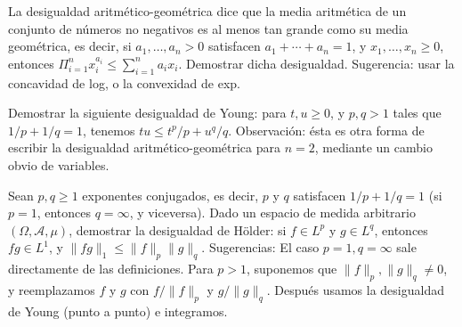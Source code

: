 
\begin{problem}[3]La desigualdad aritm\'etico-geom\'etrica 
dice que la media  aritm\'etica de un conjunto de n\'umeros no negativos es al menos tan grande
como su media  geom\'etrica, es decir, si $a_1, \dots ,a_n > 0$ satisfacen  $a_1 + \cdots  + a_n = 1$,  y  
 $x_1, \dots ,x_n \ge 0$, entonces $\Pi_{i=1}^n x_i^{a_i} \le \sum_{i=1}^n a_i x_i$.
Demostrar dicha desigualdad. Sugerencia: usar la concavidad
de log, o la convexidad de exp.
\solution

\begin{expla}

\end{expla}

\end{problem}


\begin{problem}[4]Demostrar la siguiente desigualdad de Young: para $t, u \ge 0$, y $p,q > 1$ tales que
$1/p + 1/q =1$, tenemos $tu \le t^p/ p + u^q/ q$. Observaci\'on: \'esta es otra forma de
escribir la  desigualdad aritm\'etico-geom\'etrica para $n=2$, mediante un cambio obvio de variables.
\solution

\begin{expla}

\end{expla}

\end{problem}


\begin{problem}[5]Sean $p,q \ge 1$ exponentes conjugados, es decir, $p$ y $q$ satisfacen
$1/p + 1/q =1$ (si $p=1$, entonces $q = \infty$, y viceversa).
Dado un espacio de medida arbitrario $(\Omega, \mathcal{A}, \mu)$, demostrar la desigualdad de
H\"older: si $f\in L^p$ y $g\in L^q$, entonces $fg\in L^1$, y $\|fg\|_1 \le \|f\|_p\|g\|_q$.
Sugerencias: El caso $p=1, q=\infty$ sale directamente de las definiciones.
Para $p >1$, suponemos que  $\|f\|_p, \|g\|_q\ne 0$, y reemplazamos 
$f$ y $g$ con 
 $f/\|f\|_p$ y $g/\|g\|_q$.  Despu\'es usamos la desigualdad de Young (punto a
punto) e integramos.
\solution

\begin{expla}

\end{expla}

\end{problem}


